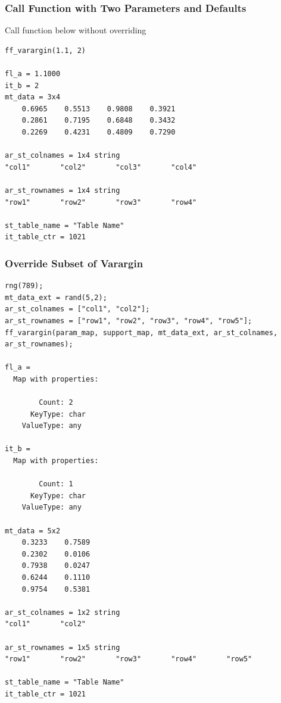 \documentclass[
]{book}
\begin{document}
\hypertarget{call-function-with-two-parameters-and-defaults}{%
\subsubsection{Call Function with Two Parameters and Defaults}\label{call-function-with-two-parameters-and-defaults}}

Call function below without overriding

\begin{verbatim}
ff_varargin(1.1, 2)

fl_a = 1.1000
it_b = 2
mt_data = 3x4    
    0.6965    0.5513    0.9808    0.3921
    0.2861    0.7195    0.6848    0.3432
    0.2269    0.4231    0.4809    0.7290

ar_st_colnames = 1x4 string    
"col1"       "col2"       "col3"       "col4"       

ar_st_rownames = 1x4 string    
"row1"       "row2"       "row3"       "row4"       

st_table_name = "Table Name"
it_table_ctr = 1021
\end{verbatim}

\hypertarget{override-subset-of-varargin}{%
\subsubsection{Override Subset of Varargin}\label{override-subset-of-varargin}}

\begin{verbatim}
rng(789);
mt_data_ext = rand(5,2);
ar_st_colnames = ["col1", "col2"];
ar_st_rownames = ["row1", "row2", "row3", "row4", "row5"];
ff_varargin(param_map, support_map, mt_data_ext, ar_st_colnames, ar_st_rownames);

fl_a = 
  Map with properties:

        Count: 2
      KeyType: char
    ValueType: any

it_b = 
  Map with properties:

        Count: 1
      KeyType: char
    ValueType: any

mt_data = 5x2    
    0.3233    0.7589
    0.2302    0.0106
    0.7938    0.0247
    0.6244    0.1110
    0.9754    0.5381

ar_st_colnames = 1x2 string    
"col1"       "col2"       

ar_st_rownames = 1x5 string    
"row1"       "row2"       "row3"       "row4"       "row5"       

st_table_name = "Table Name"
it_table_ctr = 1021
\end{verbatim}
\end{document}
